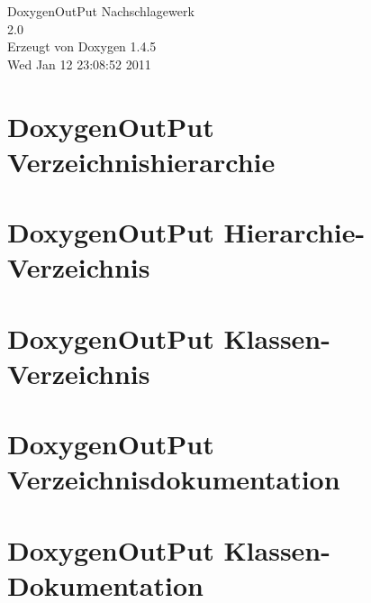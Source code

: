 \documentclass[a4paper]{book}
\begin{document}
\begin{titlepage}
\vspace*{7cm}
\begin{center}
{\Large Doxygen\-Out\-Put Nachschlagewerk\\[1ex]\large 2.0 }\\
\vspace*{1cm}
{\large Erzeugt von Doxygen 1.4.5}\\
\vspace*{0.5cm}
{\small Wed Jan 12 23:08:52 2011}\\
\end{center}
\end{titlepage}
\clearemptydoublepage
{}
\tableofcontents
\clearemptydoublepage
{}
\chapter{Doxygen\-Out\-Put Verzeichnishierarchie}

\chapter{Doxygen\-Out\-Put Hierarchie-Verzeichnis}

\chapter{Doxygen\-Out\-Put Klassen-Verzeichnis}

\chapter{Doxygen\-Out\-Put Verzeichnisdokumentation}





\chapter{Doxygen\-Out\-Put Klassen-Dokumentation}






\printindex
\end{document}

